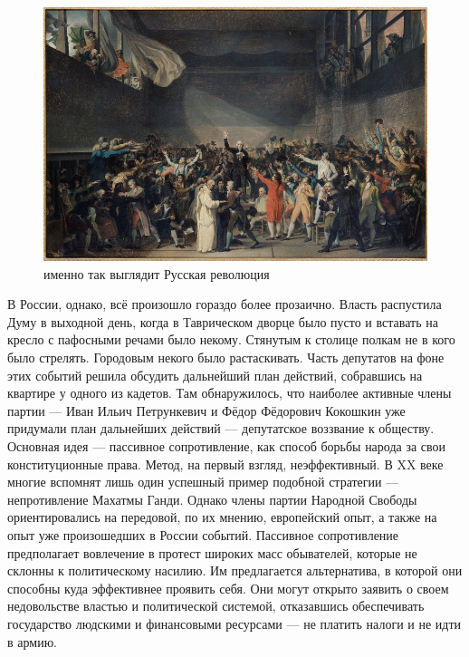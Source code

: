 \begin{figure}[h!tb] 
	\centering\includegraphics[scale=0.5]{Vozzvanie/85P4qo6DW7U.jpg}
	\caption{именно так выглядит Русская революция}%
\end{figure}

В России, однако, всё произошло гораздо более прозаично. Власть распустила Думу в выходной день, когда в Таврическом дворце было пусто и вставать на кресло с пафосными речами было некому. Стянутым к столице полкам не в кого было стрелять. Городовым некого было растаскивать. Часть депутатов на фоне этих событий решила обсудить дальнейший план действий, собравшись на квартире у одного из кадетов. Там обнаружилось, что наиболее активные члены партии — Иван Ильич Петрункевич и Фёдор Фёдорович Кокошкин уже придумали план дальнейших действий — депутатское воззвание к обществу.
Основная идея — пассивное сопротивление, как способ борьбы народа за свои конституционные права. Метод, на первый взгляд, неэффективный. В XX веке многие вспомнят лишь один успешный пример подобной стратегии — непротивление Махатмы Ганди. Однако члены партии Народной Свободы ориентировались на передовой, по их мнению, европейский опыт, а также на опыт уже произошедших в России событий.
Пассивное сопротивление предполагает вовлечение в протест широких масс обывателей, которые не склонны к политическому насилию. Им предлагается альтернатива, в которой они способны куда эффективнее проявить себя. Они могут открыто заявить о своем недовольстве властью и политической системой, отказавшись обеспечивать государство людскими и финансовыми ресурсами — не платить налоги и не идти в армию.

